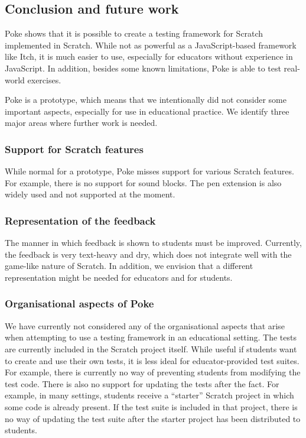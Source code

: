 \documentclass[../main]{subfiles}
\begin{document}
\subsection{Conclusion and future work}\label{subsec:conclusion-and-future-work}

Poke shows that it is possible to create a testing framework for Scratch implemented in Scratch.
While not as powerful as a JavaScript-based framework like Itch, it is much easier to use, especially for educators without experience in JavaScript.
In addition, besides some known limitations, Poke is able to test real-world exercises.

Poke is a prototype, which means that we intentionally did not consider some important aspects, especially for use in educational practice.
We identify three major areas where further work is needed.

\subsubsection{Support for Scratch features}
While normal for a prototype, Poke misses support for various Scratch features.
For example, there is no support for sound blocks.
The pen extension is also widely used and not supported at the moment.

\subsubsection{Representation of the feedback}
The manner in which feedback is shown to students must be improved.
Currently, the feedback is very text-heavy and dry, which does not integrate well with the game-like nature of Scratch.
In addition, we envision that a different representation might be needed for educators and for students.

\subsubsection{Organisational aspects of Poke}
We have currently not considered any of the organisational aspects that arise when attempting to use a testing framework in an educational setting.
The tests are currently included in the Scratch project itself.
While useful if students want to create and use their own tests, it is less ideal for educator-provided test suites.
For example, there is currently no way of preventing students from modifying the test code.
There is also no support for updating the tests after the fact.
For example, in many settings, students receive a ``starter'' Scratch project in which some code is already present.
If the test suite is included in that project, there is no way of updating the test suite after the starter project has been distributed to students.
\end{document}
